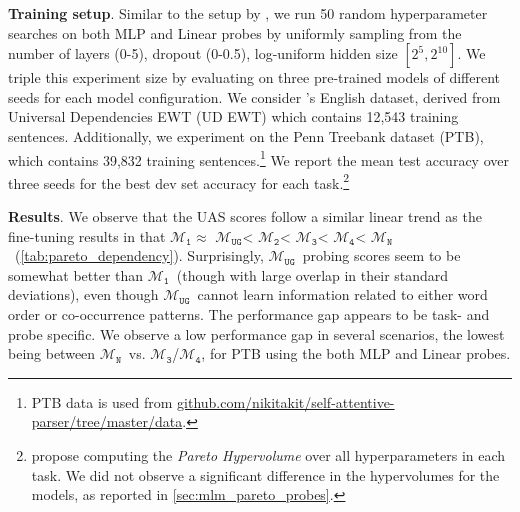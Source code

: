 \documentclass[letterpaper, 12pt]{report}
\newcommand{\xhdr}[1]{{\noindent\bfseries #1}.}
\newcommand{\OR}{$\mathcal{M}_{\texttt{N}}$}
\newcommand{\RI}{$\mathcal{M}_{\texttt{1}}$}
\newcommand{\RII}{$\mathcal{M}_{\texttt{2}}$}
\newcommand{\RIII}{$\mathcal{M}_{\texttt{3}}$}
\newcommand{\RIV}{$\mathcal{M}_{\texttt{4}}$}
\newcommand{\RC}{$\mathcal{M}_{\texttt{UG}}$}
\begin{document}
\xhdr{Training setup} Similar to the setup by \citet{pimentel-etal-2020-pareto}, we run 50 random hyperparameter searches on both MLP and Linear probes by uniformly sampling from the number of layers (0-5), dropout (0-0.5), log-uniform hidden size $[2^{5}, 2^{10}]$. We triple this experiment size by evaluating on three pre-trained models of different seeds for each model configuration.
We consider \citeauthor{pimentel-etal-2020-pareto}'s English dataset, derived from Universal Dependencies EWT (UD EWT) \citep{bies2012english, silveira2014gold} which contains 12,543 training sentences.
Additionally, we experiment on the Penn Treebank dataset (PTB), which contains 39,832 training sentences.\footnote{PTB data \citep{kitaev-etal-2019-multilingual} is used from \href{https://github.com/nikitakit/self-attentive-parser/tree/master/data}{github.com/nikitakit/self-attentive-parser/tree/master/data}.}
We report the mean test accuracy over three seeds for the best dev set accuracy for each task.\footnote{\citet{pimentel-etal-2020-pareto} propose computing the \textit{Pareto Hypervolume} over all hyperparameters in each task. We did not observe a significant difference in the hypervolumes for the models, as reported in \autoref{sec:mlm_pareto_probes}.}





\xhdr{Results} We observe that
the UAS scores follow a similar linear trend as the fine-tuning results in that \RI $\approx$ \RC < \RII < \RIII < \RIV < \OR\ (\autoref{tab:pareto_dependency}).
Surprisingly, \RC\ probing scores seem to be somewhat better than \RI\ (though with large overlap in their standard deviations), even though \RC\ cannot learn information related to either word order or co-occurrence patterns.
The performance gap appears to be task- and probe specific.
We observe a low performance gap in several scenarios, the lowest being between \OR\ vs. \RIII/\RIV, for PTB using the both MLP and Linear probes.
\end{document}
